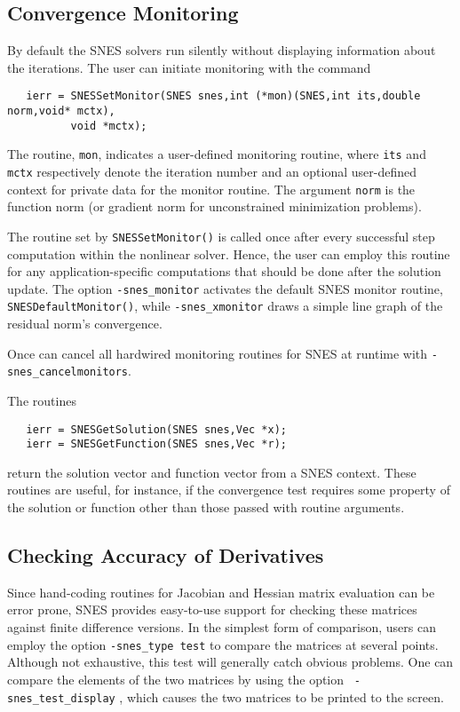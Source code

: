 \subsection{Convergence Monitoring}
\label{sec:snesmonitor}

By default the SNES solvers run silently without displaying information
about the iterations. The user can initiate monitoring with the
command  
\begin{verbatim}
   ierr = SNESSetMonitor(SNES snes,int (*mon)(SNES,int its,double norm,void* mctx),
          void *mctx);
\end{verbatim}
The routine, {\tt mon}, indicates a user-defined monitoring routine,
where {\tt its} and {\tt mctx} respectively denote the iteration
number and an optional user-defined context for private data for the
monitor routine.  The argument {\tt norm} is the function norm (or
gradient norm for unconstrained minimization problems).

The routine set by {\tt SNESSetMonitor()} is called once after every
successful step computation within the nonlinear solver.  Hence, the
user can employ this routine for any application-specific computations
that should be done after the solution update. The option
{\tt -snes\_monitor}  activates the default
SNES monitor routine, {\tt SNESDefaultMonitor()}, 
while {\tt -snes\_xmonitor}  draws
a simple line graph of the residual norm's convergence.

Once can cancel all hardwired monitoring routines for SNES at runtime with 
{\tt -snes\_cancelmonitors}. 


The routines  
\begin{verbatim}
   ierr = SNESGetSolution(SNES snes,Vec *x);
   ierr = SNESGetFunction(SNES snes,Vec *r);
\end{verbatim}
return the solution vector and function vector from a SNES context. 
These routines are useful, for instance, if the convergence test requires 
some property of the solution or function other than those passed with
routine arguments.

\subsection{Checking Accuracy of Derivatives}
\label{sec:snesderivs}

Since hand-coding routines for Jacobian and Hessian matrix evaluation
can be error prone, SNES provides easy-to-use support for checking
these matrices against finite difference versions.  In the simplest
form of comparison, users can employ the option {\tt -snes\_type test}
to compare the matrices at several points.  Although not exhaustive,
this test will generally catch obvious problems.  One can compare the
elements of the two matrices by using the option {\tt
-snes\_test\_display} , which causes the two 
matrices to be printed to the screen.  

